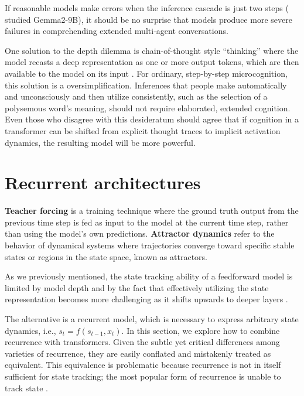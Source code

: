 \documentclass{article}
\begin{document}
If reasonable models make errors when the inference cascade is
just two steps (\citeauthor{lepori2025} studied Gemma2-9B), it should be no surprise that models produce more severe failures
in comprehending extended multi-agent conversations. 

One solution to the depth dilemma is chain-of-thought style ``thinking'' where
the model recasts a deep representation as one or more output tokens, which are
then available to the model on its input \citep{wei2022chain}. For ordinary, step-by-step 
microcognition, this solution is a oversimplification. Inferences that people make 
automatically and unconsciously and then utilize consistently, such as the 
selection of a polysemous word's meaning, should not require elaborated, extended 
cognition. Even those who disagree with this desideratum should agree that if 
cognition in a transformer can be shifted from explicit thought traces to implicit
activation dynamics, the resulting model will be more powerful.

\section{Recurrent architectures}

\textbf{Teacher forcing} is a training technique where the ground truth output from the previous time step is fed as input to the model at the current time step, rather than using the model's own predictions. \textbf{Attractor dynamics} refer to the behavior of dynamical systems where trajectories converge toward specific stable states or regions in the state space, known as attractors.

As we previously mentioned, the state tracking ability of a feedforward model is limited
by model depth  \citep[e.g.,][]{merrill-sabharwal-2023-parallelism,Strobl2024,merrill2025}
and by the fact that effectively utilizing the state
representation becomes more challenging as it shifts upwards to deeper layers
\citep{biran2024,lepori2025,sawyer2025,venhoff2025}.

The alternative is a recurrent model, which is necessary to express arbitrary 
state dynamics, i.e., $s_t = f(s_{t-1},x_t)$. In this section, we explore
how to combine recurrence with transformers.
Given the subtle yet critical differences among varieties of recurrence, they are easily conflated and mistakenly
treated as equivalent.
This equivalence is problematic because recurrence is not
in itself sufficient for state tracking; the most popular
form of recurrence is unable to track state \citep{merrill2025illusion}.
\end{document}
